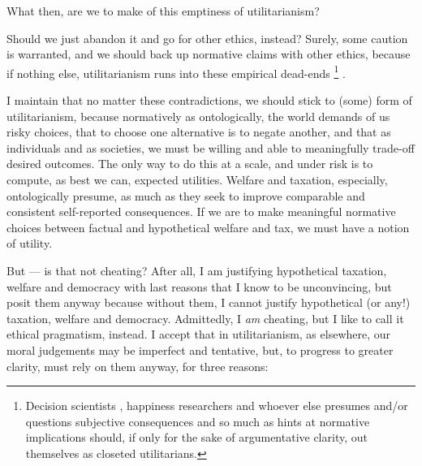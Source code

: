 What then, are we to make of this emptiness of utilitarianism?

Should we just abandon it and go for other ethics, instead? Surely, some caution is warranted, and we should back up normative claims with other ethics, because if nothing else, utilitarianism runs into these empirical dead-ends
\footnote{
	Decision scientists \citep[for example,][]{Kahneman2011}, happiness researchers \citep[for example,][]{Veenhoven-2000-aa} and whoever else presumes and/or questions subjective consequences and so much as hints at normative implications should, if only for the sake of argumentative clarity, out themselves as closeted utilitarians.
}
.

I maintain that no matter these contradictions, we should stick to (some) form of utilitarianism, because normatively as ontologically, the world demands of us risky choices, that to choose one alternative is to negate another, and that as individuals and as societies, we must be willing and able to meaningfully trade-off desired outcomes.
The only way to do this at a scale, and under risk is to compute, as best we can, expected utilities.
Welfare and taxation, especially, ontologically presume, as much as they seek to improve comparable and consistent self-reported consequences.
If we are to make meaningful normative choices between factual and hypothetical welfare and tax, we must have a notion of utility.

But --- is that not cheating? %
After all, I am justifying hypothetical taxation, welfare and democracy with last reasons that I know to be unconvincing, but posit them anyway because without them, I cannot justify hypothetical (or any!) taxation, welfare and democracy.
Admittedly, I \emph{am} cheating, but I like to call it ethical pragmatism, instead.
I accept that in utilitarianism, as elsewhere, our moral judgements may be imperfect and tentative, but, to progress to greater clarity, must rely on them anyway, for three reasons:

